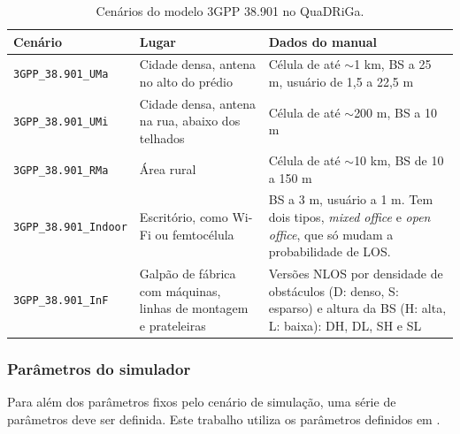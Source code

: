 \begin{table}[htbp]
\caption{Cenários do modelo 3GPP 38.901 no QuaDRiGa.}
\label{tab:cenarios_38901}
\centering
\footnotesize
\renewcommand{\arraystretch}{1.2}
\begin{tabular}{|p{3.6cm}|p{4.4cm}|p{5.2cm}|}
\hline
\raggedright Cenário & \raggedright Lugar & \raggedright Dados do manual \tabularnewline
\hline
\raggedright \texttt{3GPP\_\allowbreak{}38.901\_\allowbreak{}UMa} & \raggedright Cidade densa, antena no alto do prédio & \raggedright Célula de até $\sim$1 km, BS a 25 m, usuário de 1,5 a 22,5 m \tabularnewline
\hline
\raggedright \texttt{3GPP\_\allowbreak{}38.901\_\allowbreak{}UMi} & \raggedright Cidade densa, antena na rua, abaixo dos telhados & \raggedright Célula de até $\sim$200 m, BS a 10 m \tabularnewline
\hline
\raggedright \texttt{3GPP\_\allowbreak{}38.901\_\allowbreak{}RMa} & \raggedright Área rural & \raggedright Célula de até $\sim$10 km, BS de 10 a 150 m \tabularnewline
\hline
\raggedright \texttt{3GPP\_\allowbreak{}38.901\_\allowbreak{}Indoor} & \raggedright Escritório, como Wi-Fi ou femtocélula & \raggedright BS a 3 m, usuário a 1 m. Tem dois tipos, \textit{mixed office} e \textit{open office}, que só mudam a probabilidade de LOS. \tabularnewline
\hline
\raggedright \texttt{3GPP\_\allowbreak{}38.901\_\allowbreak{}InF} & \raggedright Galpão de fábrica com máquinas, linhas de montagem e prateleiras & \raggedright Versões NLOS por densidade de obstáculos (D: denso, S: esparso) e altura da BS (H: alta, L: baixa): DH, DL, SH e SL \tabularnewline
\hline
\end{tabular}
\end{table}

\subsubsection{Parâmetros do simulador}
Para além dos parâmetros fixos pelo cenário de simulação, uma série de parâmetros deve ser definida. Este trabalho utiliza os parâmetros definidos em \cite{zhao2025jsac}.  
